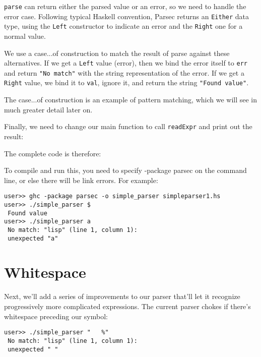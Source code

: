 \verb|parse| can return either the parsed value or an error, so we need to handle the error case. Following typical Haskell convention, Parsec returns an \verb|Either| data type, using the \verb|Left| constructor to indicate an error and the \verb|Right| one for a normal value.
 
We use a case...of construction to match the result of parse against these
alternatives. If we get a \verb|Left| value (error), then we bind the error itself to
\verb|err| and return \lstinline|"No match"| with the string representation of the error. If we get
a \verb|Right| value, we bind it to \verb|val|, ignore it, and return the string \lstinline|"Found value"|.
 
The case...of construction is an example of pattern matching, which we will see in much greater detail later on.
 
Finally, we need to change our main function to call \verb|readExpr| and print out the result:
 
 
The complete code is therefore:
 
 
To compile and run this, you need to specify -package parsec on the command line, or else there will be link errors. For example:
 
\begin{lstlisting}[language=shell,numbers=none,nolol]
user>> ghc -package parsec -o simple_parser simpleparser1.hs
user>> ./simple_parser $
 Found value
user>> ./simple_parser a
 No match: "lisp" (line 1, column 1):
 unexpected "a"
\end{lstlisting}
 
\section{Whitespace}
 
Next, we'll add a series of improvements to our parser that'll let it recognize progressively more complicated expressions. The current parser chokes if there's whitespace preceding our symbol:
 
\begin{lstlisting}[language=shell,numbers=none,nolol]
user>> ./simple_parser "   %"
 No match: "lisp" (line 1, column 1):
 unexpected " "
\end{lstlisting} 
 

